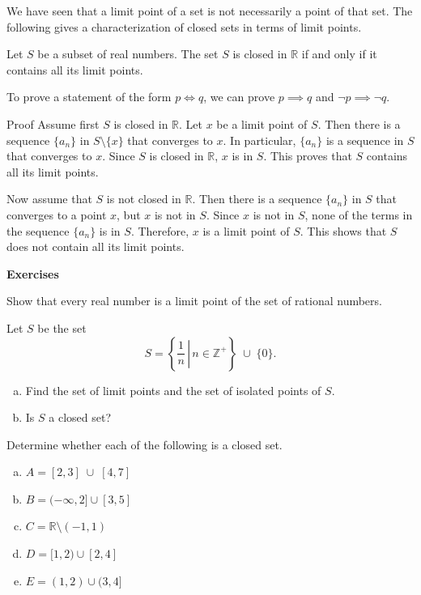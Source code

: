 We have seen that a limit point of a set is not necessarily a point of that set. The following gives a characterization of closed sets in terms of limit points.
\begin{theorem}{}
Let $S$ be a subset of real numbers. The set $S$ is closed in $\mathbb{R}$ if and only if it contains all its limit points.

\end{theorem}
To prove a statement of the form $p\iff q$, we can prove $p\implies q$ and $\neg p \implies \neg q$.
\begin{myproof}{Proof}
Assume first $S$ is closed in $\mathbb{R}$. Let $x$ be a limit point of $S$. Then there is a sequence $\{a_n\}$ in $S\setminus\{x\}$ that converges to $x$. In particular, $\{a_n\}$ is a sequence in $S$ that converges to $x$. Since $S$ is closed in $\mathbb{R}$, $x$ is in $S$. This proves that $S$ contains all its limit points.


Now assume that $S$ is not closed in $\mathbb{R}$. Then there is a sequence $\{a_n\}$ in $S$ that converges to a point $x$, but $x$ is not in $S$. Since $x$ is not in $S$, none of the terms in the sequence $\{a_n\}$ is in $S$. Therefore, $x$ is a limit point of $S$. This shows that $S$ does not contain all its limit points.
\end{myproof}

\vp
\noindent
{\bf \large Exercises  \thesection}
\setcounter{myquestion}{1}

 \begin{question}{\themyquestion} 
 Show  that every real number is a limit point of the set of rational numbers.

\end{question}

\atc
 \begin{question}{\themyquestion} 
Let $S$ be the set
\[S=\left\{\left.\frac{1}{n}\,\right|\,n\in\mathbb{Z}^+\right\}\;\cup\;\{0\}.\]
\begin{enumerate}[(a)]
\item Find the set of limit points and the set of isolated points of $S$.
\item Is $S$ a closed set?
\end{enumerate}
\end{question}

\atc


 \begin{question}{\themyquestion} 
 Determine whether each of the following is a closed set.
\begin{enumerate}[(a)]\item $A=[2, 3]\;\cup\;[4, 7]$
\item $B=(-\infty, 2]\cup [3, 5]$
\item $C=\mathbb{R}\setminus (-1,1)$
\item $D=[1, 2)\cup [2, 4]$
\item $E=(1, 2)\cup (3, 4]$
\end{enumerate}
\end{question}

